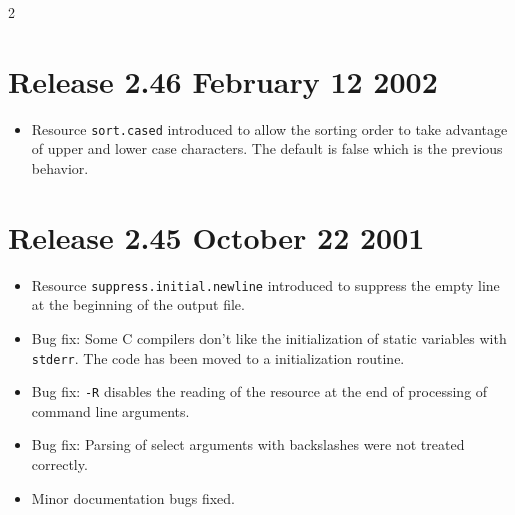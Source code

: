 \documentclass[11pt,a4paper]{scrartcl}
\newcommand\rsc[1]{\texttt{#1}}
\newenvironment{Releases}{\begin{multicols}2\RaggedRight}{\end{multicols}}
\newenvironment{Release}[2]{%
  \def\tmp{#2}%
  \section*{Release #1 \ifx\tmp\empty\else{\normalsize[#2]}\fi}
  \begin{itemize}
}{\end{itemize}}
\newenvironment{Fix}[1]{\item }{}
\newenvironment{New}[1]{\item }{}
\newenvironment{Doc}[1]{\item }{}
\begin{document}
\begin{Releases}
 \begin{Release}{2.46}{February 12 2002}
  \begin{New}{gene}
    Resource \rsc{sort.cased} introduced to allow the sorting order to
    take advantage of upper and lower case characters. The default is
    false which is the previous behavior.
  \end{New}
 \end{Release}

 \begin{Release}{2.45}{October 22 2001}
  \begin{New}{gene}
    Resource \rsc{suppress.initial.newline} introduced to suppress the
    empty line at the beginning of the output file.
  \end{New}
  \begin{Fix}{gene}
    Bug fix: Some C compilers don't like the initialization of static
    variables with \texttt{stderr}. The code has been moved to a
    initialization routine.
  \end{Fix}
  \begin{Fix}{gene}
    Bug fix: \texttt{-R} disables the reading of the resource at the
    end of processing of command line arguments.
  \end{Fix}
  \begin{Fix}{gene}
    Bug fix: Parsing of select arguments with backslashes were not treated
    correctly.
  \end{Fix}
  \begin{Doc}{gene}
    Minor documentation bugs fixed.
  \end{Doc}
 \end{Release}


\end{Releases}
\end{document}
